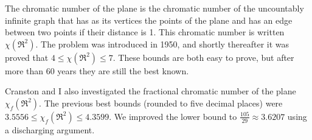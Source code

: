 \documentclass[12pt]{article}
\theoremstyle{plain}
\theoremstyle{definition}
\theoremstyle{remark}
\begin{document}
The chromatic number of the plane is the chromatic number of the uncountably
infinite graph that has as its vertices the points of the plane and has an edge
between two points if their distance is 1.  This chromatic number is written $\chi(\Re^2)$.  
The problem was introduced in 1950, and shortly thereafter 
it was proved that $4\le \chi(\Re^2)\le 7$.
These bounds are both easy to prove, but after more than 60 years they
are still the best known.

Cranston and I \cite{cranston2015fractional} also investigated the fractional chromatic number of the plane $\chi_f(\Re^2)$.
The previous best bounds (rounded to five decimal places) were $3.5556 \le
\chi_f(\Re^2)\le 4.3599$.  We improved the lower bound to $\frac{105}{29}\approx3.6207$ using a discharging argument.




\end{document}
